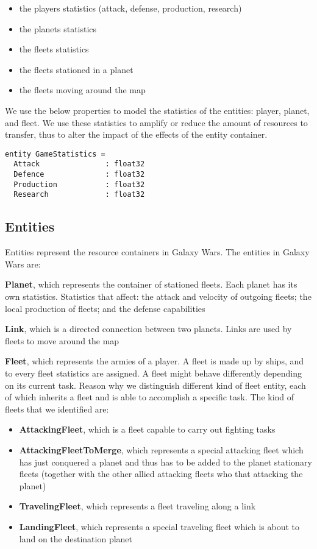 \begin{itemize}[noitemsep]
\item the players statistics (attack, defense, production, research)
\item the planets statistics
\item the fleets statistics
\item the fleets stationed in a planet
\item the fleets moving around the map
\end{itemize}

\noindent
We use the below properties to model the statistics of the entities: player, planet, and fleet. We use these statistics to amplify or reduce the amount of resources to transfer, thus to alter the impact of the effects of the entity container.
\begin{lstlisting}
entity GameStatistics =
  Attack               : float32
  Defence              : float32
  Production           : float32
  Research             : float32
\end{lstlisting}



\subsection{Entities}
\noindent
Entities represent the resource containers in Galaxy Wars. The entities in Galaxy Wars are: 

\noindent
\newline
\textbf{Planet}, which represents the container of stationed fleets. Each planet has its own statistics. Statistics that affect: the attack and velocity of outgoing fleets; the local production of fleets; and the defense capabilities

\noindent
\newline
\textbf{Link}, which is a directed connection between two planets. Links are used by fleets to move around the map	

\noindent
\newline
\textbf{Fleet}, which represents the armies of a player. A fleet is made up by ships, and to every fleet statistics are assigned. A fleet might behave differently depending on its current task. Reason why we distinguish different kind of fleet entity, each of which inherits a fleet and is able to accomplish a specific task. The kind of fleets that we identified are:
		\begin{itemize}[noitemsep]
			\item \textbf{AttackingFleet}, which is a fleet capable to carry out fighting tasks
			\item \textbf{AttackingFleetToMerge}, which represents a special attacking fleet which has just conquered a planet and thus has to be added to the planet stationary fleets (together with the other allied attacking fleets who that attacking the planet)
			\item \textbf{TravelingFleet}, which represents a fleet traveling along a link
			\item \textbf{LandingFleet}, which represents a special traveling fleet which is about to land on the destination planet
		\end{itemize}
		
